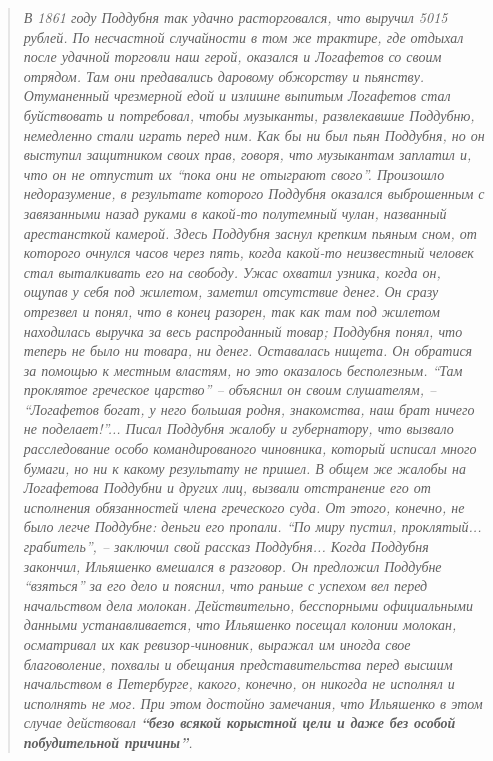 \begin{quote}
\em
В 1861 году Поддубня так удачно расторговался, что выручил 5015 рублей. По
несчастной случайности в том же трактире, где отдыхал после удачной торговли
наш герой, оказался и Логафетов со своим отрядом. Там они предавались даровому
обжорству и пьянству. Отуманенный чрезмерной едой и излишне выпитым Логафетов
стал буйствовать и потребовал, чтобы музыканты, развлекавшие Поддубню,
немедленно стали играть перед ним. Как бы ни был пьян Поддубня, но он выступил
защитником своих прав, говоря, что музыкантам заплатил и, что он не отпустит их
\enquote{пока они не отыграют свого}. Произошло недоразумение, в результате которого
Поддубня оказался выброшенным с завязанными назад руками в какой-то полутемный
чулан, названный арестансткой камерой. Здесь Поддубня заснул крепким пьяным
сном, от которого очнулся часов через пять, когда какой-то неизвестный человек
стал выталкивать его на свободу. Ужас охватил узника, когда он, ощупав у себя
под жилетом, заметил отсутствие денег. Он сразу отрезвел и понял, что в конец
разорен, так как там под жилетом находилась выручка за весь распроданный товар;
Поддубня понял, что теперь не было ни товара, ни денег. Оставалась нищета. Он
обратися за помощью к местным властям, но это оказалось бесполезным. \enquote{Там
проклятое греческое царство} – объяснил он своим слушателям, – \enquote{Логафетов
богат, у него большая родня, знакомства, наш брат ничего не поделает!}... Писал
Поддубня жалобу и губернатору, что вызвало расследование особо командированого
чиновника, который исписал много бумаги, но ни к какому результату не пришел. В
общем же жалобы на Логафетова Поддубни и других лиц, вызвали отстранение его от
исполнения обязанностей члена греческого суда. От этого, конечно, не было легче
Поддубне: деньги его пропали. \enquote{По миру пустил, проклятый... грабитель}, – заключил
свой рассказ Поддубня... Когда Поддубня закончил, Ильяшенко вмешался в разговор.
Он предложил Поддубне \enquote{взяться} за его дело и пояснил, что раньше с успехом вел
перед начальством дела молокан. Действительно, бесспорными официальными данными
устанавливается, что Ильяшенко посещал колонии молокан, осматривал их как
ревизор-чиновник, выражал им иногда свое благоволение, похвалы и обещания
представительства перед высшим начальством в Петербурге, какого, конечно, он
никогда не исполнял и исполнять не мог. При этом достойно замечания, что
Ильяшенко в этом случае действовал \textbf{\enquote{безо всякой корыстной цели и даже без
особой побудительной причины}}.  
\end{quote}

